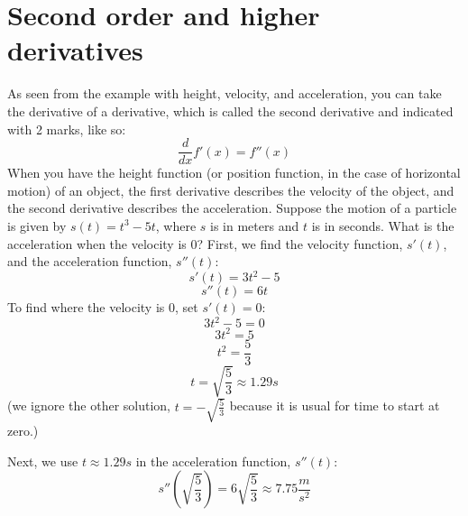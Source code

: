 \section{Second order and higher derivatives}
As seen from the example with height, velocity, and acceleration, you can take the derivative of a derivative, which is called the second derivative and indicated with 2 marks, like so: 
$$\frac{d}{dx}f'(x) = f''(x)$$
When you have the height function (or position function, in the case of horizontal motion) of an object, the first derivative describes the velocity of the object, and the second derivative describes the acceleration. Suppose the motion of a particle is given by $s(t) = t^3-5t$, where $s$ is in meters and $t$ is in seconds.  What is the acceleration when the velocity is $0$? First, we find the velocity function, $s'(t)$, and the acceleration function, $s''(t)$:
$$s'(t) = 3t^2-5$$
$$s''(t) = 6t$$
To find where the velocity is $0$, set $s'(t) = 0$:
$$3t^2-5=0$$
$$3t^2=5$$
$$t^2=\frac{5}{3}$$
$$t = \sqrt{\frac{5}{3}} \approx 1.29s$$ (we ignore the other solution, $t=-\sqrt{\frac{5}{3}}$ because it is usual for time to start at zero.)

Next, we use $t\approx 1.29s$ in the acceleration function, $s''(t)$:
$$s''(\sqrt{\frac{5}{3}}) = 6\sqrt{\frac{5}{3}} \approx 7.75 \frac{m}{s^2}$$

